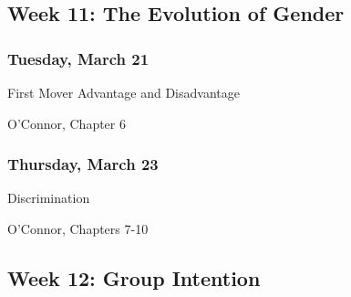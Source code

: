 \documentclass[
]{article}
\providecommand{\tightlist}{%
  \setlength{\itemsep}{0pt}\setlength{\parskip}{0pt}}
\begin{document}
\hypertarget{week-11-the-evolution-of-gender}{%
\subsection{Week 11: The Evolution of
Gender}\label{week-11-the-evolution-of-gender}}

\begin{multicols}{2}

\hypertarget{tuesday-march-21}{%
\subsubsection{Tuesday, March 21}\label{tuesday-march-21}}

\begin{description}
\tightlist
\item[Topic]
First Mover Advantage and Disadvantage
\item[Reading]
O'Connor, Chapter 6
\end{description}

\hypertarget{thursday-march-23}{%
\subsubsection{Thursday, March 23}\label{thursday-march-23}}

\begin{description}
\tightlist
\item[Topic]
Discrimination
\item[Reading]
O'Connor, Chapters 7-10
\end{description}

\end{multicols}

\newpage

\hypertarget{week-12-group-intention}{%
\subsection{Week 12: Group Intention}\label{week-12-group-intention}}
\end{document}
